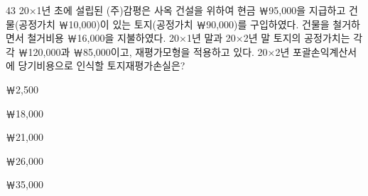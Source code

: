\begin{question}{43}
20×1년 초에 설립된 (주)감평은 사옥 건설을 위하여 현금 ￦95,000을 지급하고 건물(공정가치 ￦10,000)이 있는 토지(공정가치 ￦90,000)를 구입하였다. 건물을 철거하면서 철거비용 ￦16,000을 지불하였다. 20×1년 말과 20×2년 말 토지의 공정가치는 각각 ￦120,000과 ￦85,000이고, 재평가모형을 적용하고 있다. 20×2년 포괄손익계산서에 당기비용으로 인식할 토지재평가손실은?
\begin{choices}
  \item ￦2,500
  \item ￦18,000
  \item ￦21,000
  \item ￦26,000
  \item ￦35,000
\end{choices}
\end{question}
